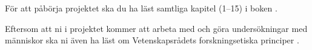 För att påbörja projektet ska du ha läst samtliga kapitel (1--15) i boken 
 \citep{Sharp2011idb}.

Eftersom att ni i projektet kommer att arbeta med och göra undersökningar med 
människor ska ni även ha läst om Vetenskapsrådets forskningsetiska principer
\citep{VR2002fpi}.
